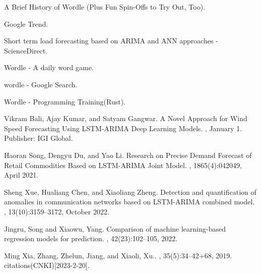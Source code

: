 \documentclass[12pt]{article}  %
\begin{document}
\newpage
\begin{thebibliography}{99}

A {Brief} {History} of {Wordle} ({Plus} {Fun} {Spin}-{Offs} to {Try} {Out},
  {Too}).

Google Trend.

Short term load forecasting based on {ARIMA} and {ANN} approaches -
  {ScienceDirect}.

Wordle - {A} daily word game.

wordle - {Google} Search. 

Wordle - Programming Training({Rust}).

Vikram Bali, Ajay Kumar, and Satyam Gangwar.
\newblock A {Novel} {Approach} for {Wind} {Speed} {Forecasting} {Using}
  {LSTM}-{ARIMA} {Deep} {Learning} {Models}.
,
  January 1.
\newblock Publisher: IGI Global.

Haoran Song, Dengyu Du, and Yao Li.
\newblock Research on {Precise} {Demand} {Forecast} of {Retail} {Commodities}
  {Based} on {LSTM}-{ARIMA} {Joint} {Model}.
, 1865(4):042049, April 2021.

Sheng Xue, Hualiang Chen, and Xiaoliang Zheng.
\newblock Detection and quantification of anomalies in communication networks
  based on {LSTM}-{ARIMA} combined model.
, 13(10):3159--3172, October
  2022.

Jingru, Song and Xiaowu, Yang.
\newblock Comparison of machine learning-based regression models for prediction.
, 42(23):102--105, 2022.

Ming Xia, Zhang, Zhelun, Jiang, and Xiaoli, Xu..
, 35(5):34--42+68, 2019.
 citations(CNKI)[2023-2-20].


\end{thebibliography}
\end{document}

